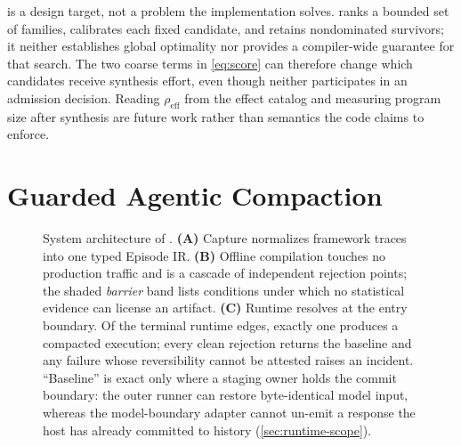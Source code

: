  is a design target, not a problem the implementation solves.
 ranks a bounded set of families, calibrates each fixed candidate, and
retains nondominated survivors; it neither establishes global optimality nor provides a
compiler-wide guarantee for that search.  The two coarse terms in \eqref{eq:score} can
therefore change which candidates receive synthesis effort, even though neither participates
in an admission decision.  Reading $\rho_{\mathrm{eff}}$ from the effect catalog and
measuring program size after synthesis are future work rather than semantics the code claims
to enforce.


\section{Guarded Agentic Compaction}
\label{sec:method}

\begin{figure}[t]
  \centering
  
  \caption{System architecture of \method.  \textbf{(A)} Capture normalizes framework
  traces into one typed Episode IR.  \textbf{(B)} Offline compilation touches no
  production traffic and is a cascade of independent rejection points; the shaded
  \emph{barrier} band lists conditions under which no statistical evidence can license
  an artifact.  \textbf{(C)} Runtime resolves at the entry boundary.  Of the terminal
  runtime edges, exactly one produces a compacted execution; every clean rejection returns
  the baseline and any failure whose reversibility cannot be attested raises an incident.
  ``Baseline'' is exact only where a staging owner holds the
  commit boundary: the outer runner can restore byte-identical model input, whereas the
  model-boundary adapter cannot un-emit a response the host has already committed to
  history (\cref{sec:runtime-scope}).}
  \label{fig:pipeline}
\end{figure}

